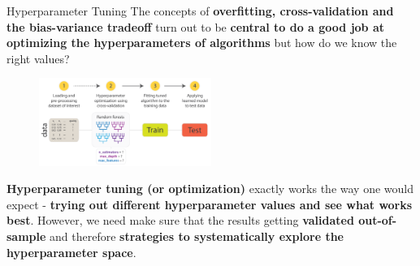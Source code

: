 \documentclass[document.tex]{subfiles}
\begin{document}
    \begin{frame}{Hyperparameter Tuning}
        The concepts of \textbf{overfitting, cross-validation and the bias-variance tradeoff} turn out to be \textbf{central to do a good job at optimizing the hyperparameters of algorithms} but how do we know the right values?

        \begin{figure}
            \label{fig:hyperparameter-tusdning}
            \includegraphics[width=0.5\textwidth]{figures/external/hyperparameter-tuning.png}
        \end{figure}

        \textbf{Hyperparameter tuning (or optimization)} exactly works the way one would expect - \textbf{trying out different hyperparameter values and see what works best}. However, we need make sure that the results getting \textbf{validated out-of-sample} and therefore \textbf{strategies to systematically explore the hyperparameter space}.
    \end{frame}
\end{document}
